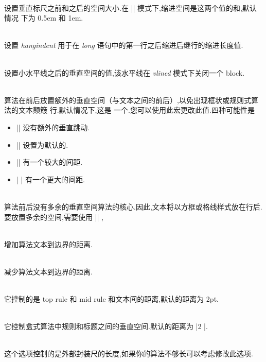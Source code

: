 \noindent \cprotect {} \\
设置垂直标尺之前和之后的空间大小.在 |\OnLine| 模式下,缩进空间是这两个值的和,默认情况
下为 0.5em 和 1em.

\noindent \cprotect {}\\
  设置 \textit{hangindent} 用于在 \textit{long} 语句中的第一行之后缩进后继行的缩进长度值.

\noindent \cprotect {}	\\ 
设置小水平线之后的垂直空间的值,该水平线在 \textit{vlined} 模式下关闭一个 block.

\noindent \cprotect {} 	\\
  算法在前后放置额外的垂直空间（与文本之间的前后）,以免出现框状或规则式算法的文本颠簸
行.默认情况下,这是
一个.您可以使用此宏更改此值.四种可能性是
\begin{itemize}
	\item 	|\SetAlgoSkip{}| 没有额外的垂直跳动.
	\item  ||  设置为默认的.
	\item ||   有一个较大的间距.
	\item  | |  有一个更大的间距.
\end{itemize}

\noindent \cprotect {}  \\
算法前后没有多余的垂直空间算法的核心.因此,文本将以方框或格线样式放在行后.要放置多余的空间,需要使用 || ,

\noindent \cprotect {}  \\ 
增加算法文本到边界的距离.

\noindent \cprotect {}  \\ 
减少算法文本到边界的距离.

\noindent \cprotect \fbox{|\setlength{\interspacetitleruled}{xx em}|}  \\
它控制的是 top rule 和 mid rule 和文本间的距离,默认的距离为 2pt.

\noindent \cprotect \fbox{|\setlength{\interspacetitleboxruled}{x \lineskip}|} \\
它控制盒式算法中规则和标题之间的垂直空间.默认的距离为 |2 \lineskip|.

\noindent \cprotect {} \\
这个选项控制的是外部封装尺的长度,如果你的算法不够长可以考虑修改此选项.

